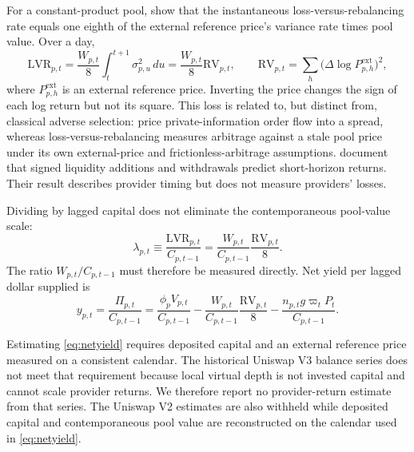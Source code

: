 For a constant-product pool, \citet{MilionisMoallemiRoughgardenZhang2022LVR} show that the instantaneous loss-versus-rebalancing rate equals one eighth of the external reference price's variance rate times pool value. Over a day,
\begin{equation}
\mathrm{LVR}_{p,t}=\frac{W_{p,t}}{8}\int_t^{t+1}\sigma^2_{p,u}\,du
=\frac{W_{p,t}}{8}\mathrm{RV}_{p,t},
\qquad
\mathrm{RV}_{p,t}=\sum_h\bigl(\Delta\log P^{\mathrm{ext}}_{p,h}\bigr)^2,
\label{eq:lvr}
\end{equation}
where $P^{\mathrm{ext}}_{p,h}$ is an external reference price. Inverting the price changes the sign of each log return but not its square. This loss is related to, but distinct from, classical adverse selection: \citet{GlostenMilgrom1985BidAsk} price private-information order flow into a spread, whereas loss-versus-rebalancing measures arbitrage against a stale pool price under its own external-price and frictionless-arbitrage assumptions. \citet{KleinKozhanViswanathNatrajWang2026InformedLP} document that signed liquidity additions and withdrawals predict short-horizon returns. Their result describes provider timing but does not measure providers' losses.

Dividing by lagged capital does not eliminate the contemporaneous pool-value scale:
\begin{equation}
\lambda_{p,t}\equiv\frac{\mathrm{LVR}_{p,t}}{C_{p,t-1}}
=\frac{W_{p,t}}{C_{p,t-1}}\frac{\mathrm{RV}_{p,t}}{8}.
\label{eq:lvrrate}
\end{equation}
The ratio $W_{p,t}/C_{p,t-1}$ must therefore be measured directly. Net yield per lagged dollar supplied is
\begin{equation}
y_{p,t}=\frac{\Pi_{p,t}}{C_{p,t-1}}
=\frac{\phi_pV_{p,t}}{C_{p,t-1}}
-\frac{W_{p,t}}{C_{p,t-1}}\frac{\mathrm{RV}_{p,t}}{8}
-\frac{n_{p,t}g\varpi_tP_t}{C_{p,t-1}}.
\label{eq:netyield}
\end{equation}

Estimating \eqref{eq:netyield} requires deposited capital and an external reference price measured on a consistent calendar. The historical Uniswap V3 balance series does not meet that requirement because local virtual depth is not invested capital and cannot scale provider returns. We therefore report no provider-return estimate from that series. The Uniswap V2 estimates are also withheld while deposited capital and contemporaneous pool value are reconstructed on the calendar used in \eqref{eq:netyield}.
